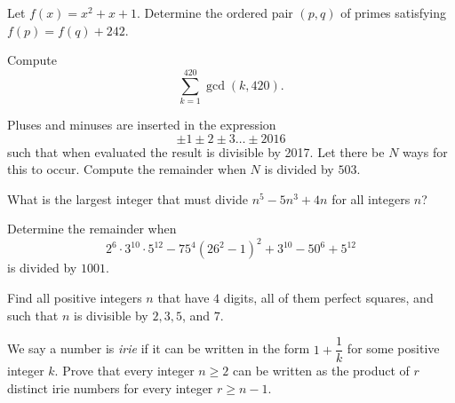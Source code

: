 \documentclass[problems.tex]{subfile}
\begin{document}
	\begin{problem}
		Let $f(x) = x^2 + x + 1$. Determine the ordered pair $(p,q)$ of primes satisfying $f(p) = f(q) + 242$. %
	\end{problem}

	\begin{problem}
		Compute \[\sum_{k=1}^{420} \gcd(k,420).\]
	\end{problem}

	\begin{problem}
		Pluses and minuses are inserted in the expression \[\pm 1 \pm 2 \pm 3 \dots \pm 2016\]such that when evaluated the result is divisible by 2017. Let there be $N$ ways for this to occur. Compute the remainder when $N$ is divided by $503$. %
	\end{problem}

	\begin{problem}
		What is the largest integer that must divide $n^5-5n^3+4n$ for all integers $n$? %
	\end{problem}

	\begin{problem}
		Determine the remainder when $$2^6\cdot3^{10}\cdot5^{12}-75^4\left(26^2-1\right)^2+3^{10}-50^6+5^{12}$$is divided by $1001$. %
	\end{problem}

	\begin{problem}[CentroAmerican 2016]
		Find all positive integers $n$ that have $4$ digits, all of them perfect squares, and such that $n$ is divisible by $2, 3, 5$, and $7$. %
	\end{problem}

	\begin{problem}[CentroAmerican 2016]
		We say a number is \textit{irie} if it can be written in the form $1+\dfrac{1}{k}$ for some positive integer $k$. Prove that every integer $n \geq 2$ can be written as the product of $r$ distinct irie numbers for every integer $r \geq n-1$. %
	\end{problem}
\end{document}
